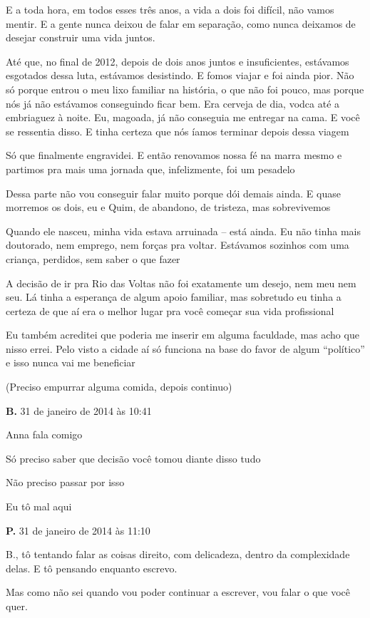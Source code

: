 {{{E a toda hora, em todos esses três anos, a vida a dois foi difícil, não
vamos mentir. E a gente nunca deixou de falar em separação, como nunca
deixamos de desejar construir uma vida juntos.

Até que, no final de 2012, depois de dois anos juntos e insuficientes,
estávamos esgotados dessa luta, estávamos desistindo. E fomos viajar e
foi ainda pior. Não só porque entrou o meu lixo familiar na história, o
que não foi pouco, mas porque nós já não estávamos conseguindo ficar
bem. Era cerveja de dia, vodca até a embriaguez à noite. Eu, magoada, já
não conseguia me entregar na cama. E você se ressentia disso. E tinha
certeza que nós íamos terminar depois dessa viagem

Só que finalmente engravidei. E então renovamos nossa fé na marra mesmo
e partimos pra mais uma jornada que, infelizmente, foi um pesadelo

Dessa parte não vou conseguir falar muito porque dói demais ainda. E
quase morremos os dois, eu e Quim, de abandono, de tristeza, mas
sobrevivemos

Quando ele nasceu, minha vida estava arruinada -- está ainda. Eu não
tinha mais doutorado, nem emprego, nem forças pra voltar. Estávamos
sozinhos com uma criança, perdidos, sem saber o que fazer

A decisão de ir pra Rio das Voltas não foi exatamente um desejo, nem meu
nem seu. Lá tinha a esperança de algum apoio familiar, mas sobretudo eu
tinha a certeza de que aí era o melhor lugar pra você começar sua vida
profissional

Eu também acreditei que poderia me inserir em alguma faculdade, mas acho
que nisso errei. Pelo visto a cidade aí só funciona na base do favor de
algum ``político'' e isso nunca vai me beneficiar

(Preciso empurrar alguma comida, depois continuo)

\textbf{B.} 31 de janeiro de 2014 às 10:41

Anna fala comigo

Só preciso saber que decisão você tomou diante disso tudo

Não preciso passar por isso

Eu tô mal aqui

\textbf{P.} 31 de janeiro de 2014 às 11:10

B., tô tentando falar as coisas direito, com delicadeza, dentro da
complexidade delas. E tô pensando enquanto escrevo.

Mas como não sei quando vou poder continuar a escrever, vou falar o que
você quer.

}}}
